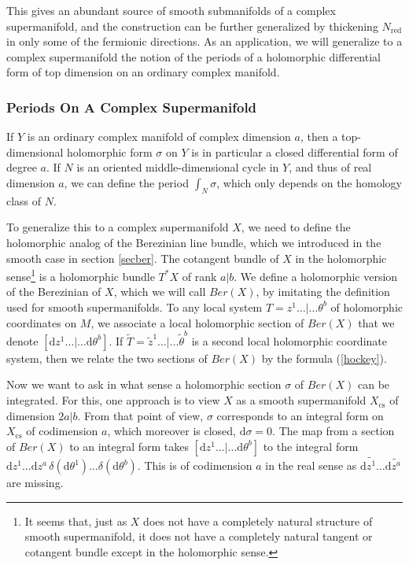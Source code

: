\documentclass[11pt,a4paper]{article}
\def\t{{ \sf t}}
\def\cs{{\mathrm{cs}}}
\def\tilde{\widetilde}
\def\red{{\mathrm{red}}}
\def\d{{\mathrm d}}
\def\t{\tilde }
\def\tilde{\widetilde}
\begin{document}
 This gives an abundant source of smooth submanifolds of a complex supermanifold,
 and the construction can be further generalized by thickening $N_\red$ in only some of the
 fermionic directions.    As an application, we will generalize to a complex supermanifold 
 the notion of the periods of a holomorphic differential form of top dimension on
an ordinary complex manifold.

\subsubsection{Periods On A Complex Supermanifold}\label{periods}



If $Y$ is an ordinary complex manifold of complex dimension $a$, then a top-dimensional holomorphic form $\sigma$ on $Y$ is in particular a closed
differential form of degree $a$.  If $N$ is an oriented middle-dimensional cycle in $Y$, and thus of real dimension $a$,
 we can define the period $\int_N\sigma$, which only depends on
the homology class of $N$.   

To generalize this to a complex supermanifold $X$, we need to define the holomorphic analog of the Berezinian line bundle, which we introduced in the smooth
case in section \ref{secber}.  
The cotangent bundle of $X$ in the holomorphic sense\footnote{It seems that, just as $X$ does not have a completely natural structure of smooth supermanifold,
it does not have a completely natural tangent or cotangent bundle except in the holomorphic sense.}    is a holomorphic bundle $T^*X$ of rank $a|b$.
We define a holomorphic version of the Berezinian of $X$, which we will call $\mathit{Ber}(X)$, by imitating the definition
used for smooth supermanifolds.    To any local  system $T=z^1\dots|\dots\theta^b$ of holomorphic coordinates on $M$, we associate
a local holomorphic section of $\mathit{Ber}(X)$ that we denote $[\d z^1\dots|\dots\d\theta^b]$.  If $\tilde T=\t z^1\dots |\dots \t\theta^b$ is a second local holomorphic coordinate
system, then we relate the two sections of $\mathit{Ber}(X)$ by the formula (\ref{hockey}).

Now we want to ask in what sense a holomorphic section $\sigma$ of $\mathit{Ber}(X)$ can be integrated.  For this, one approach is to view $X$ as a smooth supermanifold
$X_\cs$ 
of dimension $2a|b$.  From that point of view, $\sigma$ corresponds to an integral form on $X_\cs$ of codimension $a$, which moreover is closed, $\d\sigma=0$.
The map from a section of $\mathit{Ber}(X)$ to an integral form takes $[\d z^1\dots |\dots\d\theta^b]$ to the integral form $\d z^1\dots \d z^a\,\delta(\d\theta^1)\dots
\delta(\d\theta^b)$.
This is of codimension $a$ in the real sense as $\d\t{z^1}\dots\d\t{z^a}$ are missing.
\end{document}

